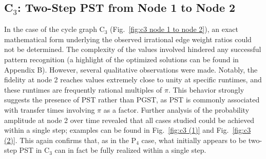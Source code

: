 \documentclass[reprint, aps, 12pt, floatfix]{revtex4-2}
\begin{document}
\subsection{C$_3$: Two-Step PST from Node 1 to Node 2}
In the case of the cycle graph C$_3$ (Fig.~\ref{fig:c3 node 1 to node 2}), an exact mathematical form underlying the observed irrational edge weight ratios could not be determined. The complexity of the values involved hindered any successful pattern recognition (a highlight of the optimized solutions can be found in Appendix B). However, several qualitative observations were made. Notably, the fidelity at node 2 reaches values extremely close to unity at specific runtimes, and these runtimes are frequently rational multiples of $\pi$. This behavior strongly suggests the presence of PST rather than PGST, as PST is commonly associated with transfer times involving $\pi$ as a factor. Further analysis of the probability amplitude at node 2 over time revealed that all cases studied could be achieved within a single step; examples can be found in Fig.~\ref{fig:c3 (1)} and Fig.~\ref{fig:c3 (2)}. This again confirms that, as in the P$_4$ case, what initially appears to be two-step PST in C$_3$ can in fact be fully realized within a single step. 
\end{document}
